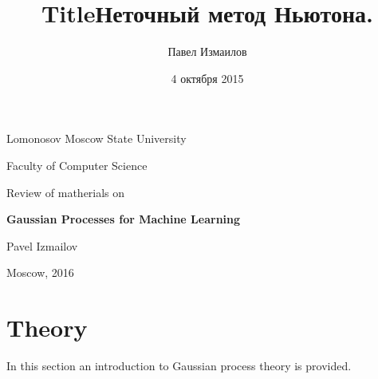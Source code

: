 \documentclass[12pt]{article}
\title{Title}
\title{Неточный метод Ньютона.}
\date{4 октября 2015}
\author{Павел Измаилов}
\begin{document}
\renewcommand{\contentsname}{\centerline{\bf Contents}}
\renewcommand{\refname}{\centerline{\bf Literature}}

\newcommand{\GP}{\mathcal{GP}}
\newcommand{\E}{\mathbb{E}}
\newcommand{\R}{\mathbb{R}}
\newcommand{\N}{\mathcal{N}}
\newcommand{\cov}{\mbox{cov}}
\newcommand{\Nystrom}{Nystr\"{o}m }
\newcommand{\KL}[2]{\mbox{KL}\left(#1\mbox{ || }#2\right)}
\newcommand{\tr}{\mbox{tr}}

\newlength{\arrayrulewidthOriginal}
\newcommand{\Cline}[2]{%
  \noalign{\global\setlength{\arrayrulewidthOriginal}{\arrayrulewidth}}%
  \noalign{\global\setlength{\arrayrulewidth}{#1}}\cline{#2}%
  \noalign{\global\setlength{\arrayrulewidth}{\arrayrulewidthOriginal}}}

\newtheorem{definition}{Definition}
\newtheorem{theorem}{Theorem}


\def\vec#1{\mathchoice{\mbox{\boldmath$\displaystyle#1$}}
{\mbox{\boldmath$\textstyle#1$}} {\mbox{\boldmath$\scriptstyle#1$}} {\mbox{\boldmath$\scriptscriptstyle#1$}}}

\centerline{Lomonosov Moscow State University}

\centerline{Faculty of Computer Science}

\vspace{5 cm}

\centerline{\Large Review of matherials on}

\vspace{1 cm}

\centerline{\Large \bf Gaussian Processes for Machine Learning}

\vspace{6 cm}

\begin{flushright}

Pavel Izmailov
\end{flushright}

\vfill 

\centerline{Moscow,  2016}
\thispagestyle{empty} 
\pagebreak

\section{Theory}

\hspace{0.6cm}In this section an introduction to Gaussian process theory is provided.
\end{document}
